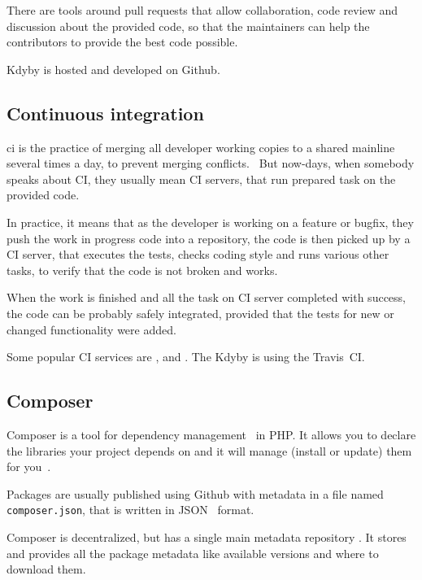 There are tools around pull requests that allow collaboration, code review and discussion about the provided code, so that the maintainers can help the contributors to provide the best code possible.

Kdyby is hosted and developed on Github.

\tocless\subsection{Continuous integration} \label{sec:theory:ci}

\gls{ci} is the practice of merging all developer working copies to a shared mainline several times a day, to prevent merging conflicts.~\cite{wiki:ci} But now-days, when somebody speaks about CI, they usually mean CI servers, that run prepared task on the provided code.

In practice, it means that as the developer is working on a feature or bugfix, they push the work in progress code into a repository, the code is then picked up by a CI server, that executes the tests, checks coding style and runs various other tasks, to verify that the code is not broken and works.

When the work is finished and all the task on CI server completed with success, the code can be probably safely integrated, provided that the tests for new or changed functionality were added.

Some popular CI services are ,  and . The Kdyby is using the Travis~CI.

\tocless\subsection{Composer} \label{sec:theory:composer}

Composer is a tool for dependency management~\cite{wiki:package-manager} in PHP. It allows you to declare the libraries your project depends on and it will manage (install or update) them for you~\cite{composer:docs:intro}.

Packages are usually published using Github with metadata in a file named \lstinline{composer.json}, that is written in JSON~\cite{wiki:json} format.

Composer is decentralized, but has a single main metadata repository . It stores and provides all the package metadata like available versions and where to download them.

